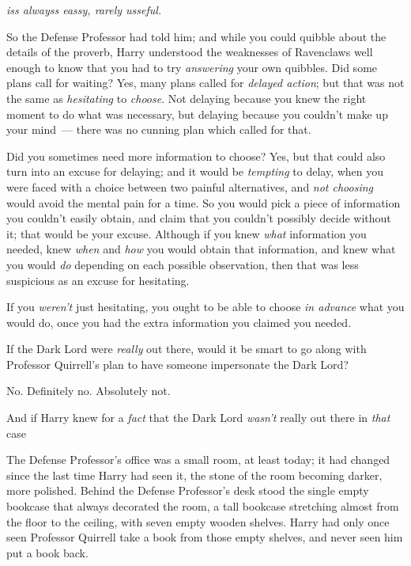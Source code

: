 
\emph{iss alwayss eassy, rarely usseful.}

So the Defense Professor had told him; and while you could quibble about the
details of the proverb, Harry understood the weaknesses of Ravenclaws well
enough to know that you had to try \emph{answering} your own quibbles. Did some
plans call for waiting? Yes, many plans called for \emph{delayed action}; but
that was not the same as \emph{hesitating} to \emph{choose}. Not delaying
because you knew the right moment to do what was necessary, but delaying
because you couldn't make up your mind~--- there was no cunning plan which called
for that.

Did you sometimes need more information to choose? Yes, but that could also
turn into an excuse for delaying; and it would be \emph{tempting} to delay,
when you were faced with a choice between two painful alternatives, and
\emph{not choosing} would avoid the mental pain for a time. So you would pick a
piece of information you couldn't easily obtain, and claim that you couldn't
possibly decide without it; that would be your excuse. Although if you knew
\emph{what} information you needed, knew \emph{when} and \emph{how} you would
obtain that information, and knew what you would \emph{do} depending on each
possible observation, then that was less suspicious as an excuse for hesitating.

If you \emph{weren't} just hesitating, you ought to be able to choose \emph{in
advance} what you would do, once you had the extra information you claimed you
needed.

If the Dark Lord were \emph{really} out there, would it be smart to go along
with Professor Quirrell's plan to have someone impersonate the Dark Lord?

No. Definitely no. Absolutely not.

And if Harry knew for a \emph{fact} that the Dark Lord \emph{wasn't} really out
there{\el} in \emph{that} case{\el}

The Defense Professor's office was a small room, at least today; it had changed
since the last time Harry had seen it, the stone of the room becoming darker,
more polished. Behind the Defense Professor's desk stood the single empty
bookcase that always decorated the room, a tall bookcase stretching almost from
the floor to the ceiling, with seven empty wooden shelves. Harry had only once
seen Professor Quirrell take a book from those empty shelves, and never seen
him put a book back.

